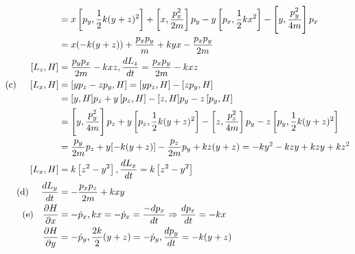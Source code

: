 \begin{enumerate}
\begin{answer}
\begin{align*}
		&=x\left[p_{y}, \frac{1}{2} k(y+z)^{2}\right]+\left[x, \frac{p_{x}^{2}}{2 m}\right] p_{y}-y\left[p_{x}, \frac{1}{2} k x^{2}\right]-\left[y, \frac{p_{y}^{2}}{4 m}\right] p_{x}\\
		&=x(-k(y+z))+\frac{p_{x} p_{y}}{m}+k y x-\frac{p_{x} p_{y}}{2 m}\\
		\left[L_{z}, H\right]&=\frac{p_{y} p_{x}}{2 m}-k x z, \frac{d L_{z}}{d t}=\frac{p_{x} p_{y}}{2 m}-k x z \\
		\text{(c) }\quad\left[L_{x}, H\right]&=\left[y p_{z}-z p_{y}, H\right]=\left[y p_{z}, H\right]-\left[z p_{y}, H\right]\\
		&=[y, H] p_{z}+y\left[p_{z}, H\right]-[z, H] p_{y}-z\left[p_{y}, H\right]\\
		&=\left[y, \frac{p_{y}^{2}}{4 m}\right] p_{z}+y\left[p_{z}, \frac{1}{2} k(y+z)^{2}\right]-\left[z, \frac{p_{z}^{2}}{4 m}\right] p_{y}-z\left[p_{y}, \frac{1}{2} k(y+z)^{2}\right]\\
		&=\frac{p_{y}}{2 m} p_{z}+y[-k(y+z)]-\frac{p_{z}}{2 m} p_{y}+k z(y+z)=-k y^{2}-k z y+k z y+k z^{2}\\
		\left[L_{x}, H\right]&=k\left[z^{2}-y^{2}\right], \frac{d L_{x}}{d t}=k\left[z^{2}-y^{2}\right] \\
		\text{(d) }\quad \frac{d L_{y}}{d t}&=-\frac{p_{x} p_{z}}{2 m}+k x y\\
	\text{	(e)\quad }
		\frac{\partial H}{\partial x}&=-\dot{p}_{x}, k x=-\dot{p}_{x}=\frac{-d p_{x}}{d t} \Rightarrow \frac{d p_{x}}{d t}=-k x\\
		\frac{\partial H}{\partial y}&=-\dot{p}_{y}, \frac{2 k}{2}(y+z)=-\dot{p}_{y}, \frac{d p_{y}}{d t}=-k(y+z)
		\end{align*}
	\end{answer}
\end{enumerate}